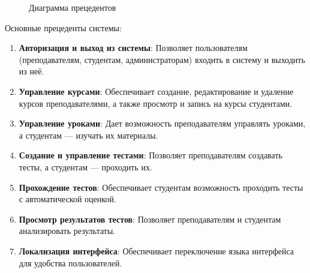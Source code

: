 \begin{figure}[ht]
	\caption{Диаграмма прецедентов}
	\label{comp:image}
\end{figure}

Основные прецеденты системы:

\begin{enumerate}
	\item \textbf{Авторизация и выход из системы}: Позволяет пользователям (преподавателям, студентам, администраторам) входить в систему и выходить из неё.
	\item \textbf{Управление курсами}: Обеспечивает создание, редактирование и удаление курсов преподавателями, а также просмотр и запись на курсы студентами.
	\item \textbf{Управление уроками}: Дает возможность преподавателям управлять уроками, а студентам --- изучать их материалы.
	\item \textbf{Создание и управление тестами}: Позволяет преподавателям создавать тесты, а студентам --- проходить их.
	\item \textbf{Прохождение тестов}: Обеспечивает студентам возможность проходить тесты с автоматической оценкой.
	\item \textbf{Просмотр результатов тестов}: Позволяет преподавателям и студентам анализировать результаты.
	\item \textbf{Локализация интерфейса}: Обеспечивает переключение языка интерфейса для удобства пользователей.
\end{enumerate}

